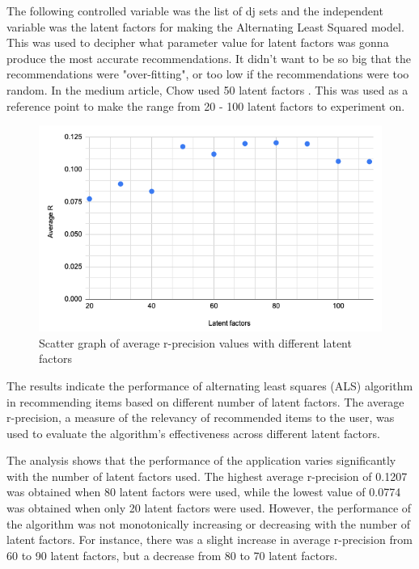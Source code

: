 The following controlled variable was the list of dj sets and the independent variable was the latent factors for making the Alternating Least Squared model. This was used to decipher what parameter value for latent factors was gonna produce the most accurate recommendations. It didn't want to be so big that the recommendations were "over-fitting", or too low if the recommendations were too random. In the medium article, Chow used 50 latent factors \citep{chow_music_2020}. This was used as a reference point to make the range from 20 - 100 latent factors to experiment on.
\begin{figure}[H]
	\includegraphics[scale=0.6]{images/average_r_over_latent}
	\centering
	\caption{Scatter graph of average r-precision values with different latent factors} 
\end{figure}

The results indicate the performance of alternating least squares (ALS) algorithm in recommending items based on different number of latent factors. The average r-precision, a measure of the relevancy of recommended items to the user, was used to evaluate the algorithm's effectiveness across different latent factors.

The analysis shows that the performance of the application varies significantly with the number of latent factors used. The highest average r-precision of 0.1207 was obtained when 80 latent factors were used, while the lowest value of 0.0774 was obtained when only 20 latent factors were used. However, the performance of the algorithm was not monotonically increasing or decreasing with the number of latent factors. For instance, there was a slight increase in average r-precision from 60 to 90 latent factors, but a decrease from 80 to 70 latent factors.


